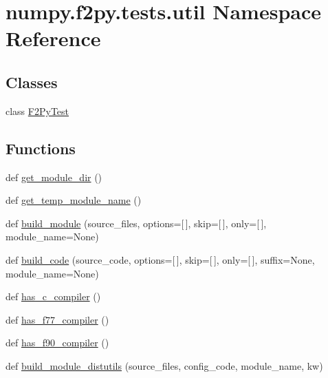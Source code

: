 \hypertarget{namespacenumpy_1_1f2py_1_1tests_1_1util}{}\section{numpy.\+f2py.\+tests.\+util Namespace Reference}
\label{namespacenumpy_1_1f2py_1_1tests_1_1util}
\subsection*{Classes}
\begin{DoxyCompactItemize}
\item 
class \hyperlink{classnumpy_1_1f2py_1_1tests_1_1util_1_1F2PyTest}{F2\+Py\+Test}
\end{DoxyCompactItemize}
\subsection*{Functions}
\begin{DoxyCompactItemize}
\item 
def \hyperlink{namespacenumpy_1_1f2py_1_1tests_1_1util_ae8d1eca29ae0f38513d5cd0d8410a4d4}{get\+\_\+module\+\_\+dir} ()
\item 
def \hyperlink{namespacenumpy_1_1f2py_1_1tests_1_1util_aee614454846f56c1c4a0b7ff65f40aff}{get\+\_\+temp\+\_\+module\+\_\+name} ()
\item 
def \hyperlink{namespacenumpy_1_1f2py_1_1tests_1_1util_aad92b0f4c45f650119de2e4d81b204ad}{build\+\_\+module} (source\+\_\+files, options=\mbox{[}$\,$\mbox{]}, skip=\mbox{[}$\,$\mbox{]}, only=\mbox{[}$\,$\mbox{]}, module\+\_\+name=None)
\item 
def \hyperlink{namespacenumpy_1_1f2py_1_1tests_1_1util_a2110796dd45546156d93d5e683dbcf2d}{build\+\_\+code} (source\+\_\+code, options=\mbox{[}$\,$\mbox{]}, skip=\mbox{[}$\,$\mbox{]}, only=\mbox{[}$\,$\mbox{]}, suffix=None, module\+\_\+name=None)
\item 
def \hyperlink{namespacenumpy_1_1f2py_1_1tests_1_1util_a7f39b841beb247597ef96b52566388cd}{has\+\_\+c\+\_\+compiler} ()
\item 
def \hyperlink{namespacenumpy_1_1f2py_1_1tests_1_1util_aa9e4e137b016111d32cd541bbf786416}{has\+\_\+f77\+\_\+compiler} ()
\item 
def \hyperlink{namespacenumpy_1_1f2py_1_1tests_1_1util_ac4d4a2456fcc3b712f17c85de57fa8a2}{has\+\_\+f90\+\_\+compiler} ()
\item 
def \hyperlink{namespacenumpy_1_1f2py_1_1tests_1_1util_ab957065f9d5eb6a698620a5221ef19e9}{build\+\_\+module\+\_\+distutils} (source\+\_\+files, config\+\_\+code, module\+\_\+name, kw)
\end{DoxyCompactItemize}



